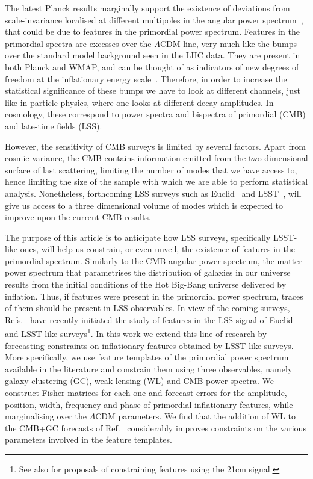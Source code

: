 \documentclass[12pt]{article}
\begin{document}
The latest Planck results marginally support the existence of deviations from scale-invariance localised at different multipoles in the angular power spectrum~\cite{Hazra:2013nca,Hazra:2014jwa,Hunt:2015iua}, that could be due to features in the primordial power spectrum. Features in the primordial spectra are excesses over the $\Lambda$CDM line, very much like the bumps over the standard model background seen in the LHC data. They are present in both Planck and WMAP, and can be thought of as indicators of new degrees of freedom at the inflationary energy scale~\cite{Arkani-Hamed:2015bza}. Therefore, in order to increase the statistical significance of these bumps we have to look at different channels, just like in particle physics, where one looks at different decay amplitudes. In cosmology, these correspond to power spectra and bispectra of primordial (CMB) and late-time fields (LSS).

However, the sensitivity of CMB surveys is limited by several factors. Apart from cosmic variance, the CMB contains information emitted from the two dimensional surface of last scattering, limiting the number of modes that we have access to, hence limiting the size of the sample with which we are able to perform statistical analysis. Nonetheless, forthcoming LSS surveys such as Euclid~\cite{Euclid-web} and LSST~\cite{Lsst-web}, will give us access to a three dimensional volume of modes which is expected to improve upon the current CMB results.
 
The purpose of this article is to anticipate how LSS surveys, specifically LSST-like ones, will help us constrain, or even unveil, the existence of features in the primordial spectrum. Similarly to the CMB angular power spectrum, the matter power spectrum that parametrises the distribution of galaxies in our universe results from the initial conditions of the Hot Big-Bang universe delivered by inflation. Thus, if features were present in the primordial power spectrum, traces of them should be present in LSS observables. In view of the coming surveys, Refs.~\cite{Huang:2012mr,Chen:2016vvw,Ballardini:2016hpi,Fard:2017oex} have recently initiated the study of features in the LSS signal of Euclid- and LSST-like surveys\footnote{See also \cite{Xu:2016kwz,Chen:2016zuu,Pourtsidou:2016ctq} for proposals of constraining features using the 21cm signal.}. In this work we extend this line of research by forecasting constraints on inflationary features obtained by LSST-like surveys. More specifically, we use feature templates of the primordial power spectrum available in the literature and constrain them using three observables, namely galaxy clustering (GC), weak lensing (WL) and CMB power spectra. We construct Fisher matrices for each one and forecast errors for the amplitude, position, width, frequency and phase of primordial inflationary features, while marginalising over the $\Lambda$CDM parameters.  We find that the addition of WL to the CMB+GC forecasts of Ref.~\cite{Chen:2016vvw} considerably improves constraints on the various parameters involved in the feature templates.
\end{document}
